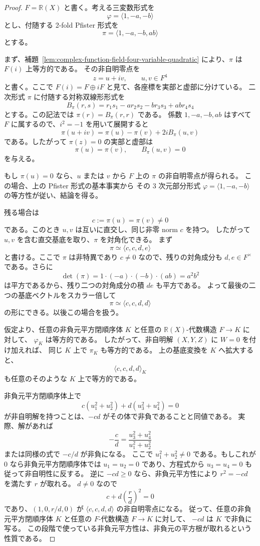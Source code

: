 \documentclass[uplatex,dvipdfmx]{jsarticle}
\newcommand{\Frac}{\mathbb{R}(X)}
\theoremstyle{matrixsosdefinition}
\begin{document}
\begin{proof}
  \(F=\Frac\) と書く。考える三変数形式を
  \[
    \varphi=\langle 1,-a,-b\rangle
  \]
  とし、付随する 2-fold Pfister 形式を
  \[
    \pi=\langle 1,-a,-b,ab\rangle
  \]
  とする。

  まず、補題~\ref{lem:complex-function-field-four-variable-quadratic} により、\(\pi\) は \(F(i)\) 上等方的である。
  その非自明零点を
  \[
    z=u+i v,\qquad u,v\in F^4
  \]
  と書く。ここで \(F(i)=F\oplus iF\) と見て、各座標を実部と虚部に分けている。
  二次形式 \(\pi\) に付随する対称双線形形式を
  \[
    B_\pi(r,s)=r_1s_1-a r_2s_2-b r_3s_3+ab r_4s_4
  \]
  とする。この記法では \(\pi(r)=B_\pi(r,r)\) である。
  係数 \(1,-a,-b,ab\) はすべて \(F\) に属するので、\(i^2=-1\) を用いて展開すると
  \[
    \pi(u+iv)=\pi(u)-\pi(v)+2iB_\pi(u,v)
  \]
  である。したがって
  \(\pi(z)=0\) の実部と虚部は
  \[
    \pi(u)=\pi(v),\qquad B_\pi(u,v)=0
  \]
  を与える。

  もし \(\pi(u)=0\) なら、\(u\) または \(v\) から \(F\) 上の \(\pi\) の非自明零点が得られる。
  この場合、上の Pfister 形式の基本事実から
  その 3 次元部分形式 \(\varphi=\langle 1,-a,-b\rangle\) の等方性が従い、結論を得る。

  残る場合は
  \[
    c:=\pi(u)=\pi(v)\ne0
  \]
  である。このとき \(u,v\) は互いに直交し、同じ非零 norm \(c\) を持つ。
  したがって \(u,v\) を含む直交基底を取り、\(\pi\) を対角化できる。
  まず
  \[
    \pi\simeq \langle c,c,d,e\rangle
  \]
  と書ける。ここで \(\pi\) は非特異であり \(c\ne0\) なので、残りの対角成分も
  \(d,e\in F^\times\) である。さらに
  \[
    \det(\pi)=1\cdot(-a)\cdot(-b)\cdot(ab)=a^2b^2
  \]
  は平方であるから、残り二つの対角成分の積 \(de\) も平方である。
  よって最後の二つの基底ベクトルをスカラー倍して
  \[
    \pi\simeq \langle c,c,d,d\rangle
  \]
  の形にできる。以後この場合を扱う。

  仮定より、任意の非負元平方閉順序体 \(K\) と任意の \(\Frac\)-代数構造 \(F\to K\) に対して、
  \(\varphi_K\) は等方的である。
  したがって、非自明解 \((X,Y,Z)\) に \(W=0\) を付け加えれば、
  同じ \(K\) 上で \(\pi_K\) も等方的である。
  上の基底変換を \(K\) へ拡大すると、
  \[
    \langle c,c,d,d\rangle_K
  \]
  も任意のそのような \(K\) 上で等方的である。

  非負元平方閉順序体上で
  \[
    c(u_1^2+u_2^2)+d(u_3^2+u_4^2)=0
  \]
  が非自明解を持つことは、\(-cd\) がその体で非負であることと同値である。
  実際、解があれば
  \[
    -\frac{c}{d}
    =
    \frac{u_3^2+u_4^2}{u_1^2+u_2^2}
  \]
  または同様の式で \(-c/d\) が非負になる。
  ここで \(u_1^2+u_2^2\ne0\) である。もしこれが \(0\) なら非負元平方閉順序体では
  \(u_1=u_2=0\) であり、方程式から \(u_3=u_4=0\) も従って非自明性に反する。
  逆に \(-cd\ge0\) なら、非負元平方性により \(r^2=-cd\) を満たす \(r\) が取れる。
  \(d\ne0\) なので
  \[
    c+d\left(\frac{r}{d}\right)^2=0
  \]
  であり、\((1,0,r/d,0)\) が \(\langle c,c,d,d\rangle\) の非自明零点になる。
  従って、任意の非負元平方閉順序体 \(K\) と任意の \(F\)-代数構造 \(F\to K\) に対して、
  \(-cd\) は \(K\) で非負に写る。
  この段階で使っている非負元平方性は、非負元の平方根が取れるという性質である。


\end{proof}
\end{document}
